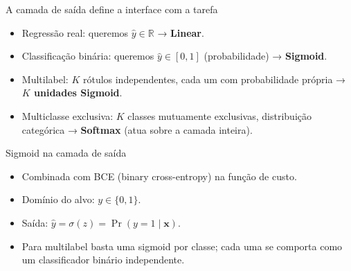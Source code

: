 \documentclass[aspectratio=169,xcolor=dvipsnames]{beamer}
\begin{document}

  \begin{frame}{A camada de saída define a interface com a tarefa}
    \begin{itemize}
      \item Regressão real: queremos $\hat y\in\mathbb{R}$ → \textbf{Linear}.
      \item Classificação binária: queremos $\hat y\in[0,1]$ (probabilidade) → \textbf{Sigmoid}.
      \item Multilabel: $K$ rótulos independentes, cada um com probabilidade própria
        → \textbf{$K$ unidades Sigmoid}.
      \item Multiclasse exclusiva: $K$ classes mutuamente exclusivas, distribuição categórica
        → \textbf{Softmax} (atua sobre a camada inteira).
    \end{itemize}
  \end{frame}

  \begin{frame}{Sigmoid na camada de saída}
    \begin{itemize}
      \item Combinada com BCE (binary cross-entropy) na função de custo.
      \item Domínio do alvo: $y\in\{0,1\}$.
      \item Saída: $\hat y = \sigma(z) = \Pr(y=1\mid \mathbf{x})$.
      \item Para multilabel basta uma sigmoid por classe; cada uma se comporta como
        um classificador binário independente.
    \end{itemize}
  \end{frame}
\end{document}
